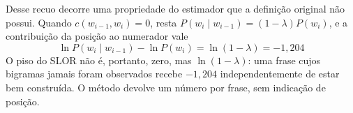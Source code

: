 Desse recuo decorre uma propriedade do estimador que a definição original não possui. Quando
$c(w_{i-1}, w_i) = 0$, resta $P(w_i \mid w_{i-1}) = (1-\lambda)P(w_i)$, e a contribuição da
posição ao numerador vale
%
\begin{equation}
\ln P(w_i \mid w_{i-1}) - \ln P(w_i) = \ln(1-\lambda) = -1{,}204
\label{eq:piso-slor}
\end{equation}
%
O piso do SLOR não é, portanto, zero, mas $\ln(1-\lambda)$: uma frase cujos bigramas jamais
foram observados recebe $-1{,}204$ independentemente de estar bem construída. O método devolve
um número por frase, sem indicação de posição.

